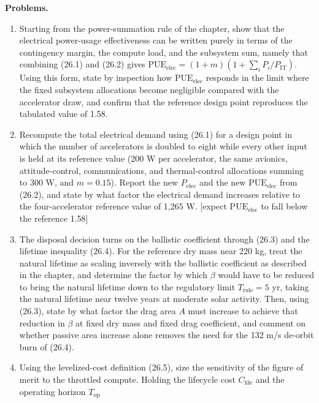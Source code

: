 \documentclass[
  11pt,
  openany,
  oneside]{book}
\begin{document}
\textbf{Problems.}

\begin{enumerate}
\def\labelenumi{\arabic{enumi}.}
\item
  Starting from the power-summation rule of the chapter, show that the
  electrical power-usage effectiveness can be written purely in terms of
  the contingency margin, the compute load, and the subsystem sum,
  namely that combining (26.1) and (26.2) gives
  \(\mathrm{PUE}_{\text{elec}} = (1+m)\left(1 + \sum_i P_i / P_{\text{IT}}\right)\).
  Using this form, state by inspection how
  \(\mathrm{PUE}_{\text{elec}}\) responds in the limit where the fixed
  subsystem allocations become negligible compared with the accelerator
  draw, and confirm that the reference design point reproduces the
  tabulated value of 1.58.
\item
  Recompute the total electrical demand using (26.1) for a design point
  in which the number of accelerators is doubled to eight while every
  other input is held at its reference value (200 W per accelerator, the
  same avionics, attitude-control, communications, and thermal-control
  allocations summing to 300 W, and \(m = 0.15\)). Report the new
  \(P_{\text{elec}}\) and the new \(\mathrm{PUE}_{\text{elec}}\) from
  (26.2), and state by what factor the electrical demand increases
  relative to the four-accelerator reference value of 1,265 W. {[}expect
  \(\mathrm{PUE}_{\text{elec}}\) to fall below the reference 1.58{]}
\item
  The disposal decision turns on the ballistic coefficient through
  (26.3) and the lifetime inequality (26.4). For the reference dry mass
  near 220 kg, treat the natural lifetime as scaling inversely with the
  ballistic coefficient as described in the chapter, and determine the
  factor by which \(\beta\) would have to be reduced to bring the
  natural lifetime down to the regulatory limit \(T_{\text{rule}} = 5\)
  yr, taking the natural lifetime near twelve years at moderate solar
  activity. Then, using (26.3), state by what factor the drag area \(A\)
  must increase to achieve that reduction in \(\beta\) at fixed dry mass
  and fixed drag coefficient, and comment on whether passive area
  increase alone removes the need for the 132 m/s de-orbit burn of
  (26.4).
\item
  Using the levelized-cost definition (26.5), size the sensitivity of
  the figure of merit to the throttled compute. Holding the lifecycle
  cost \(C_{\text{life}}\) and the operating horizon \(T_{\text{op}}\)

\end{enumerate}
\end{document}
